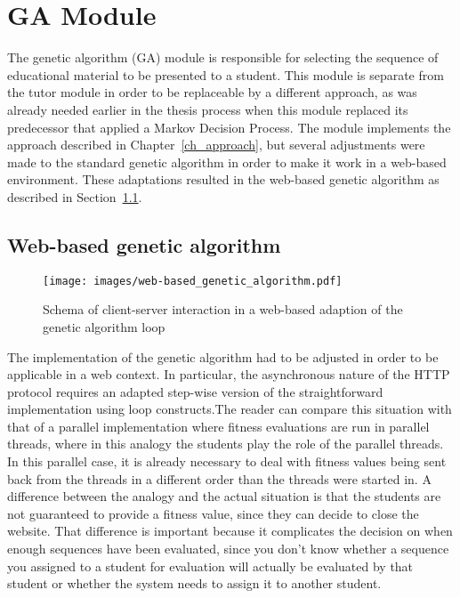 \section{GA Module}
\label{sec:software_ga_module}
The genetic algorithm (GA) module is responsible for selecting the sequence of
educational material to be presented to a student. This module is separate from
the tutor module in order to be replaceable by a different approach, as was
already needed earlier in the thesis process when this module replaced its
predecessor that applied a Markov Decision Process. The module implements the
approach described in Chapter~\ref{ch_approach}, but several adjustments were
made to the standard genetic algorithm in order to make it work in a web-based
environment. These adaptations resulted in the web-based genetic algorithm as
described in Section~\ref{sec:web-based_ga}.
\subsection{Web-based genetic algorithm}
\label{sec:web-based_ga}
\begin{figure}[ht]
	\centering
	\texttt{[image: images/web-based\_genetic\_algorithm.pdf]}
	\caption{Schema of client-server interaction in a web-based adaption of the
	genetic algorithm loop}
	\label{fig:web-based_ga}
\end{figure}
The implementation of the genetic algorithm had to be adjusted in order to be
applicable in a web context. In particular, the asynchronous nature of the HTTP
protocol requires an adapted step-wise version of the straightforward implementation
using loop constructs.The reader can compare this situation with that of a parallel
implementation where fitness evaluations are run in parallel threads, where in
this analogy the students play the role of the parallel threads. In this parallel
case, it is already necessary to deal with fitness values being sent back from the
threads in a different order than the threads were started in. A difference between
the analogy and the actual situation is that the students are not guaranteed to
provide a fitness value, since they can decide to close the website. That
difference is important because it complicates the decision on when enough
sequences have been evaluated, since you don't know whether a sequence you
assigned to a student for evaluation will actually be evaluated by that
student or whether the system needs to assign it to another student.

